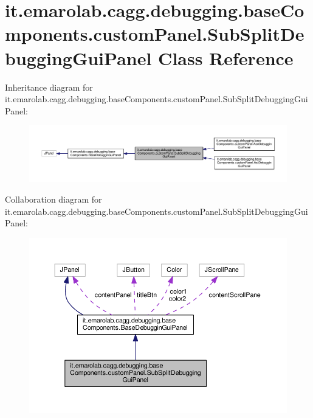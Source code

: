 \hypertarget{classit_1_1emarolab_1_1cagg_1_1debugging_1_1baseComponents_1_1customPanel_1_1SubSplitDebuggingGuiPanel}{\section{it.\-emarolab.\-cagg.\-debugging.\-base\-Components.\-custom\-Panel.\-Sub\-Split\-Debugging\-Gui\-Panel Class Reference}
\label{classit_1_1emarolab_1_1cagg_1_1debugging_1_1baseComponents_1_1customPanel_1_1SubSplitDebuggingGuiPanel}
}


Inheritance diagram for it.\-emarolab.\-cagg.\-debugging.\-base\-Components.\-custom\-Panel.\-Sub\-Split\-Debugging\-Gui\-Panel\-:\nopagebreak
\begin{figure}[H]
\begin{center}
\leavevmode
\includegraphics[width=350pt]{classit_1_1emarolab_1_1cagg_1_1debugging_1_1baseComponents_1_1customPanel_1_1SubSplitDebuggingGuiPanel__inherit__graph}
\end{center}
\end{figure}


Collaboration diagram for it.\-emarolab.\-cagg.\-debugging.\-base\-Components.\-custom\-Panel.\-Sub\-Split\-Debugging\-Gui\-Panel\-:\nopagebreak
\begin{figure}[H]
\begin{center}
\leavevmode
\includegraphics[width=350pt]{classit_1_1emarolab_1_1cagg_1_1debugging_1_1baseComponents_1_1customPanel_1_1SubSplitDebuggingGuiPanel__coll__graph}
\end{center}
\end{figure}

